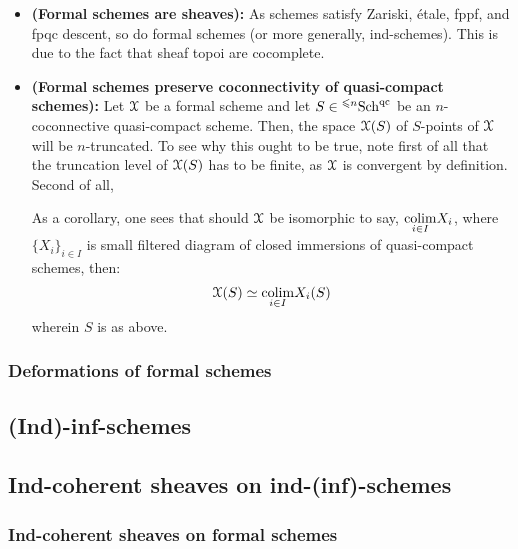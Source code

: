                 \begin{remark} \label{remark: geometric_facts_about_formal_schemes}
                    \noindent
                    \begin{itemize}
                        \item \textbf{(Formal schemes are sheaves):} As schemes satisfy Zariski, \'etale, fppf, and fpqc descent, so do formal schemes (or more generally, ind-schemes). This is due to the fact that sheaf topoi are cocomplete.
                        \item \textbf{(Formal schemes preserve coconnectivity of quasi-compact schemes):} Let $\mathcal{X}$ be a formal scheme and let $S \in {}^{\leqslant n}\mathrm{Sch}^{\mathrm{qc}}$ be an $n$-coconnective quasi-compact scheme. Then, the space $\mathcal{X}(S)$ of $S$-points of $\mathcal{X}$ will be $n$-truncated. To see why this ought to be true, note first of all that the truncation level of $\mathcal{X}(S)$ has to be finite, as $\mathcal{X}$ is convergent by definition. Second of all, 
                        
                        As a corollary, one sees that should $\mathcal{X}$ be isomorphic to say, $\underset{i \in I}{\operatorname{colim}} X_i$, where $\{X_i\}_{i \in I}$ is small filtered diagram of closed immersions of quasi-compact schemes, then:
                            $$\mathcal{X}(S) \simeq \underset{i \in I}{\operatorname{colim}} X_i(S)$$
                        wherein $S$ is as above.
                    \end{itemize}
                \end{remark}
                
            \subsubsection{Deformations of formal schemes}
        
        \subsection{(Ind)-inf-schemes}
        
        \subsection{Ind-coherent sheaves on ind-(inf)-schemes}
            \subsubsection{Ind-coherent sheaves on formal schemes}
            
